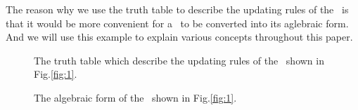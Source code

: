 \begin{example}
The reason why we use the truth table to describe the updating rules of the \BCN\ is that it would be more convenient for a \BCN\ to be converted into its aglebraic form. And we will use this example to explain various concepts throughout this paper.
  \begin{figure}[thpb]
      \centering
      
      \caption{The truth table which describe the updating rules of the \BCN\ shown in Fig.\ref{fig:1}.}
      \label{fig:2}
   \end{figure}
   \begin{figure}[thpb]
      \centering
      
      \caption{The algebraic form of the \BCN\ shown in Fig.\ref{fig:1}.}
      \label{fig:6}
   \end{figure}
   \label{exa:2}
\end{example}   


